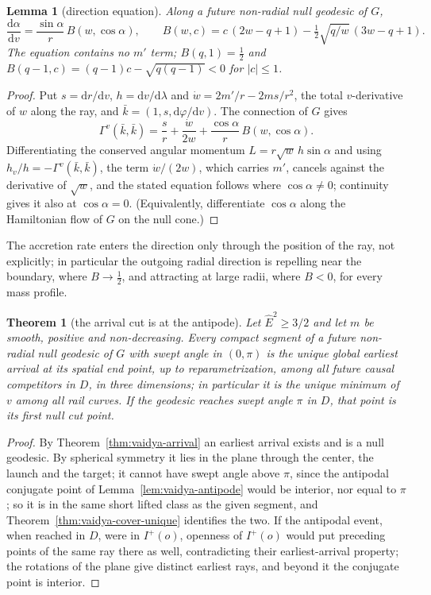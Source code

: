\documentclass[aip,jmp,amsmath,amssymb,reprint]{revtex4-2}
\newcommand{\Ehat}{\hat E}
\newcommand{\dd}{\mathrm{d}}
\theoremstyle{plain}
\newtheorem{theorem}{Theorem}
\newtheorem{lemma}[proposition]{Lemma}
\theoremstyle{definition}
\begin{document}
\begin{lemma}[direction equation]\label{lem:vaidya-direction}
Along a future non-radial null geodesic of $G$,
\[
  \frac{\dd\alpha}{\dd v}=\frac{\sin\alpha}{r}\,B(w,\cos\alpha),\qquad
  B(w,c)=c\,(2w-q+1)-\tfrac12\sqrt{q/w}\,(3w-q+1).
\]
The equation contains no $m'$ term; $B(q,1)=\tfrac12$ and
$B(q-1,c)=(q-1)c-\sqrt{q(q-1)}<0$ for $|c|\le1$.
\end{lemma}

\begin{proof}
Put $s=\dd r/\dd v$, $h=\dd v/\dd\lambda$ and $\dot w=2m'/r-2ms/r^2$, the total $v$-derivative of $w$
along the ray, and $\bar k=(1,s,\dd\varphi/\dd v)$. The connection of $G$ gives
\[
  \Gamma^v(\bar k,\bar k)=\frac{s}{r}+\frac{\dot w}{2w}+\frac{\cos\alpha}{r}\,B(w,\cos\alpha).
\]
Differentiating the conserved angular momentum $L=r\sqrt w\,h\sin\alpha$ and using
$h_v/h=-\Gamma^v(\bar k,\bar k)$, the term $\dot w/(2w)$, which carries $m'$, cancels against the
derivative of $\sqrt w$, and the stated equation follows where $\cos\alpha\ne0$; continuity gives it
also at $\cos\alpha=0$. (Equivalently, differentiate $\cos\alpha$ along the Hamiltonian flow of $G$ on
the null cone.)
\end{proof}


The accretion rate enters the direction only through the position of the ray, not explicitly;
in particular the outgoing radial direction is repelling near the boundary, where $B\to\frac12$,
and attracting at large radii, where $B<0$, for every mass profile.

\begin{theorem}[the arrival cut is at the antipode]\label{thm:vaidya-antipodal-cut}
Let $\Ehat^2\ge3/2$ and let $m$ be smooth, positive and non-decreasing. Every compact segment of
a future non-radial null geodesic of $G$ with swept angle in $(0,\pi)$ is the unique global
earliest arrival at its spatial end point, up to reparametrization, among all future causal
competitors in $D$, in three dimensions; in particular it is the unique minimum of $v$ among
all rail curves. If the geodesic reaches swept angle $\pi$ in $D$, that point is its first null
cut point.
\end{theorem}

\begin{proof}
By Theorem~\ref{thm:vaidya-arrival} an earliest arrival exists and is a null geodesic. By
spherical symmetry it lies in the plane through the center, the launch and the target; it
cannot have swept angle above $\pi$, since the antipodal conjugate point of
Lemma~\ref{lem:vaidya-antipode} would be interior, nor equal to $\pi$; so it is in the same short
lifted class as the given segment, and Theorem~\ref{thm:vaidya-cover-unique} identifies the two.
If the antipodal event, when reached in $D$, were in $I^+(o)$, openness of $I^+(o)$ would put
preceding points of the same ray there as well, contradicting their earliest-arrival property;
the rotations of the plane give distinct earliest rays, and beyond it the conjugate point is
interior.
\end{proof}
\end{document}
